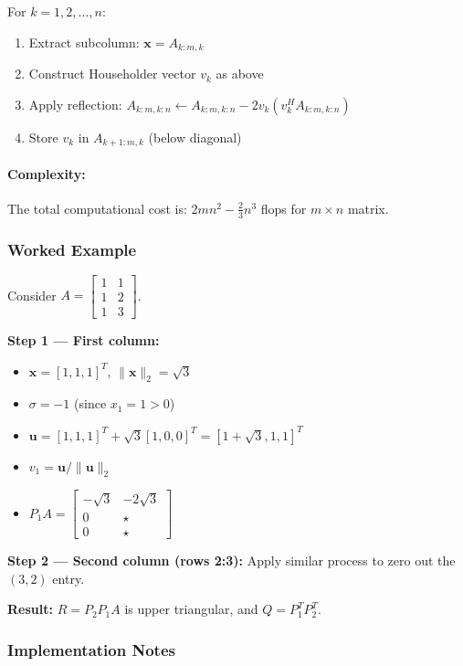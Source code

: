 For $k = 1, 2, \ldots, n$:
\begin{enumerate}
    \item Extract subcolumn: $\mathbf{x} = A_{k:m,k}$
    \item Construct Householder vector $v_k$ as above
    \item Apply reflection: $A_{k:m,k:n} \leftarrow A_{k:m,k:n} - 2v_k(v_k^H A_{k:m,k:n})$
    \item Store $v_k$ in $A_{k+1:m,k}$ (below diagonal)
\end{enumerate}

\paragraph{Complexity:}
The total computational cost is: $2mn^2 - \frac{2}{3}n^3$ flops for $m \times n$ matrix.

\subsubsection{Worked Example}

Consider $A = \begin{bmatrix} 1 & 1 \\ 1 & 2 \\ 1 & 3 \end{bmatrix}$.

\textbf{Step 1 — First column:}
\begin{itemize}
    \item $\mathbf{x} = [1, 1, 1]^T$, $\|\mathbf{x}\|_2 = \sqrt{3}$
    \item $\sigma = -1$ (since $x_1 = 1 > 0$)
    \item $\mathbf{u} = [1, 1, 1]^T + \sqrt{3}[1, 0, 0]^T = [1+\sqrt{3}, 1, 1]^T$
    \item $v_1 = \mathbf{u}/\|\mathbf{u}\|_2$
    \item $P_1 A = \begin{bmatrix} -\sqrt{3} & -2\sqrt{3} \\ 0 & \star \\ 0 & \star \end{bmatrix}$
\end{itemize}

\textbf{Step 2 — Second column (rows 2:3):}
Apply similar process to zero out the $(3,2)$ entry.

\textbf{Result:} $R = P_2 P_1 A$ is upper triangular, and $Q = P_1^T P_2^T$.

\subsubsection{Implementation Notes}

